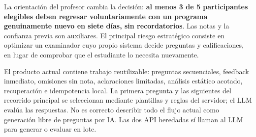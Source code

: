 \documentclass[11pt,a4paper]{report}
\begin{document}
La orientación del profesor cambia la decisión: \textbf{al menos 3 de 5 participantes elegibles deben regresar voluntariamente con un programa genuinamente nuevo en siete días, sin recordatorios}. Las notas y la confianza previa son auxiliares. El principal riesgo estratégico consiste en optimizar un examinador cuyo propio sistema decide preguntas y calificaciones, en lugar de comprobar que el estudiante lo necesita nuevamente.

El producto actual contiene trabajo reutilizable: preguntas secuenciales, feedback inmediato, omisiones sin nota, aclaraciones limitadas, análisis estático acotado, recuperación e idempotencia local. La primera pregunta y las siguientes del recorrido principal se seleccionan mediante plantillas y reglas del servidor; el LLM evalúa las respuestas. No es correcto describir todo el flujo actual como generación libre de preguntas por IA. Las dos API heredadas sí llaman al LLM para generar o evaluar en lote.
\end{document}

